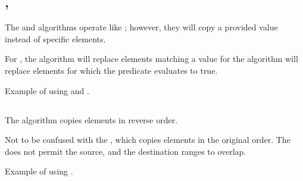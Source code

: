 \subsection{\texorpdfstring{, }{\texttt{std::replace\_copy}, \texttt{std::replace\_copy\_if}}}

The  and  algorithms operate like ; however, they will copy a provided value instead of specific elements.

For , the algorithm will replace elements matching a value for  the algorithm will replace elements for which the predicate evaluates to true.


\begin{box-note}
\footnotesize Example of using  and .
\tcblower
{}
\end{box-note}

\subsection{\texorpdfstring{}{\texttt{std::reverse\_copy}}}

The  algorithm copies elements in reverse order.


Not to be confused with the , which copies elements in the original order. The  does not permit the source, and the destination ranges to overlap.

\begin{box-note}
\footnotesize Example of using .
\tcblower
{}
\end{box-note}

\subsection{\texorpdfstring{}{\texttt{std::rotate\_copy}}}


